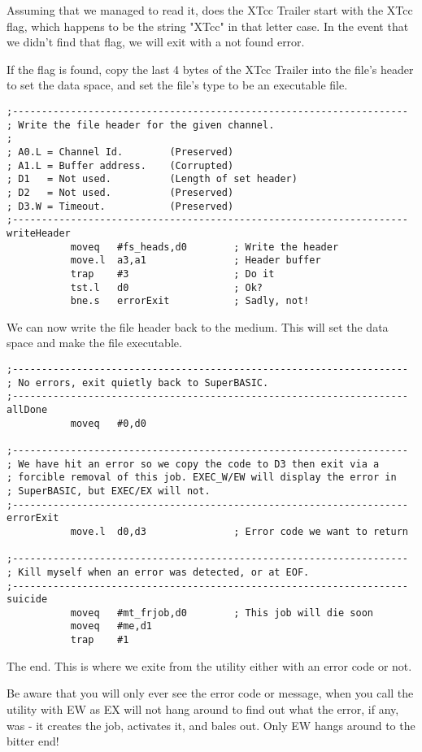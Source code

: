 Assuming that we managed to read it, does the XTcc Trailer start with the XTcc flag, which happens to be the string "XTcc" in that letter case. In the event that we didn't find that flag, we will exit with a not found error.

If the flag is found, copy the last 4 bytes of the XTcc Trailer into the file's header to set the data space, and set the file's type to be an executable file.


\begin{lstlisting}[firstnumber=last,caption={XTcc - Writing the Header}]
;--------------------------------------------------------------------
; Write the file header for the given channel.
;
; A0.L = Channel Id.        (Preserved)
; A1.L = Buffer address.    (Corrupted)
; D1   = Not used.          (Length of set header)
; D2   = Not used.          (Preserved)
; D3.W = Timeout.           (Preserved)
;--------------------------------------------------------------------
writeHeader
           moveq   #fs_heads,d0        ; Write the header
           move.l  a3,a1               ; Header buffer
           trap    #3                  ; Do it
           tst.l   d0                  ; Ok?
           bne.s   errorExit           ; Sadly, not!
\end{lstlisting}

We can now write the file header back to the medium. This will set the data space and make the file executable.


\begin{lstlisting}[firstnumber=last,caption={XTcc - Termination}]
;--------------------------------------------------------------------
; No errors, exit quietly back to SuperBASIC.
;--------------------------------------------------------------------
allDone
           moveq   #0,d0

;--------------------------------------------------------------------
; We have hit an error so we copy the code to D3 then exit via a
; forcible removal of this job. EXEC_W/EW will display the error in
; SuperBASIC, but EXEC/EX will not.
;--------------------------------------------------------------------
errorExit
           move.l  d0,d3               ; Error code we want to return

;--------------------------------------------------------------------
; Kill myself when an error was detected, or at EOF.
;--------------------------------------------------------------------
suicide
           moveq   #mt_frjob,d0        ; This job will die soon
           moveq   #me,d1
           trap    #1
\end{lstlisting}

The end. This is where we exite from the utility either with an error code or not.

Be aware that you will only ever see the error code or message, when you call the utility with EW as EX will not hang around to find out what the error, if any, was - it creates the job, activates it, and bales out. Only EW hangs around to the bitter end!

